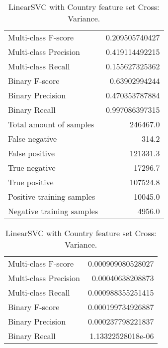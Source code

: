 \begin{table}[H]
\begin{minipage}{0.5\textwidth}
\caption{LinearSVC with Country feature set Cross: Average.}
\centering
\begin{tabular}{l r}
\toprule
Multi-class F-score & 0.209505740427 \\
Multi-class Precision & 0.419114492215 \\
Multi-class Recall & 0.155627325362 \\
\midrule
Binary F-score & 0.63902994244 \\
Binary Precision & 0.470353787884 \\
Binary Recall & 0.997086397315 \\
\midrule
Total amount of samples & 246467.0 \\
False negative & 314.2 \\
False positive & 121331.3 \\
True negative & 17296.7 \\
True positive & 107524.8 \\
\midrule
Positive training samples & 10045.0 \\
Negative training samples & 4956.0 \\
\bottomrule
\end{tabular}
\end{minipage}
\hfillx
\begin{minipage}{0.5\textwidth}
\caption{LinearSVC with Country feature set Cross: Variance.}
\centering
\begin{tabular}{l r}
\toprule
Multi-class F-score & 0.000909080528027 \\
Multi-class Precision & 0.00040638208873 \\
Multi-class Recall & 0.000988355251415 \\
\midrule
Binary F-score & 0.000199734926887 \\
Binary Precision & 0.000237798221837 \\
Binary Recall & 1.13322528018e-06 \\
\bottomrule
\end{tabular}
\end{minipage}
\end{table}

